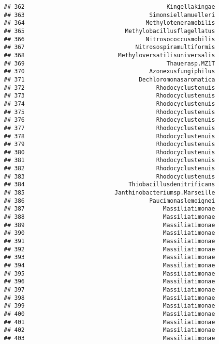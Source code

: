 \documentclass[
]{article}
\begin{document}
\begin{verbatim}
## 362                                         Kingellakingae
## 363                                    Simonsiellamuelleri
## 364                                   Methyloteneramobilis
## 365                             Methylobacillusflagellatus
## 366                                   Nitrosococcusmobilis
## 367                                Nitrosospiramultiformis
## 368                           Methyloversatilisuniversalis
## 369                                         Thauerasp.MZ1T
## 370                                    Azonexusfungiphilus
## 371                                 Dechloromonasaromatica
## 372                                      Rhodocyclustenuis
## 373                                      Rhodocyclustenuis
## 374                                      Rhodocyclustenuis
## 375                                      Rhodocyclustenuis
## 376                                      Rhodocyclustenuis
## 377                                      Rhodocyclustenuis
## 378                                      Rhodocyclustenuis
## 379                                      Rhodocyclustenuis
## 380                                      Rhodocyclustenuis
## 381                                      Rhodocyclustenuis
## 382                                      Rhodocyclustenuis
## 383                                      Rhodocyclustenuis
## 384                              Thiobacillusdenitrificans
## 385                          Janthinobacteriumsp.Marseille
## 386                                    Paucimonaslemoignei
## 387                                        Massiliatimonae
## 388                                        Massiliatimonae
## 389                                        Massiliatimonae
## 390                                        Massiliatimonae
## 391                                        Massiliatimonae
## 392                                        Massiliatimonae
## 393                                        Massiliatimonae
## 394                                        Massiliatimonae
## 395                                        Massiliatimonae
## 396                                        Massiliatimonae
## 397                                        Massiliatimonae
## 398                                        Massiliatimonae
## 399                                        Massiliatimonae
## 400                                        Massiliatimonae
## 401                                        Massiliatimonae
## 402                                        Massiliatimonae
## 403                                        Massiliatimonae

\end{verbatim}
\end{document}
